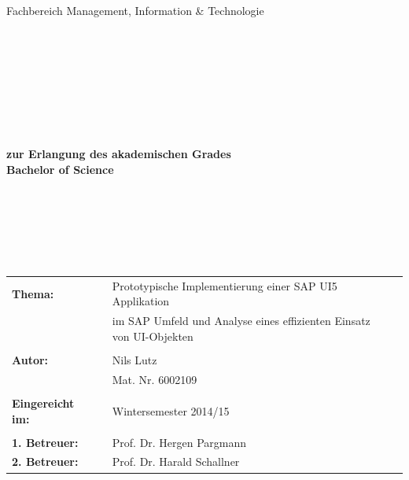\begin{center}
\Large{Fachbereich Management, Information \& Technologie}
\end{center}
\begin{verbatim}




\end{verbatim}
\begin{center}
\doublespacing
\textbf{\LARGE{\titleDocument}}\\
\singlespacing
\begin{verbatim}

\end{verbatim}
\end{center}
\begin{verbatim}

\end{verbatim}
\begin{center}

\end{center}
\begin{verbatim}

\end{verbatim}
\begin{center}
\textbf{zur Erlangung des akademischen Grades \\ Bachelor of Science}
\end{center}
\begin{verbatim}






\end{verbatim}
\begin{flushleft}
\begin{tabular}{llll}
\textbf{Thema:} & & Prototypische Implementierung einer SAP UI5 Applikation & \\
& & im SAP Umfeld und Analyse eines effizienten Einsatz von UI-Objekten & \\
& & \\
\textbf{Autor:} & & Nils Lutz& \\
& & Mat. Nr. 6002109 & \\
& & \\
\textbf{Eingereicht im:} & & Wintersemester 2014/15 &\\
& & \\
\textbf{1. Betreuer:} & & Prof. Dr. Hergen Pargmann &\\
\textbf{2. Betreuer:} & & Prof. Dr. Harald Schallner &\\
\end{tabular}
\end{flushleft}